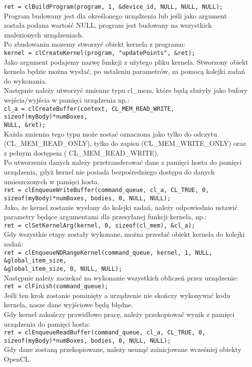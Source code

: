 \centering\verb+ret = clBuildProgram(program, 1, &device_id, NULL, NULL, NULL);+\\\flushleft
Program budowany jest dla określonego urządzenia lub jeśli jako argument została podana wartość NULL, program jest budowany na wszystkich znalezionych urządzeniach. \\
Po zbudowaniu mozemy stworzyć obiekt kernela z programu:\\
\centering\verb+kernel = clCreateKernel(program, "updatePoints", &ret);+\\\flushleft
Jako argument podajemy nazwę funkcji z użytego pliku kernela. Stworzony obiekt kernela będzie można wysłać, po ustaleniu parametrów, za pomocą kolejki zadań do wykonania. \\
Następnie należy utworzyć zmienne typu cl\_mem, które będą służyły jako bufory wejścia/wyjścia w pamięci urządzenia np.:\\
\centering\verb+cl_a = clCreateBuffer(context, CL_MEM_READ_WRITE, sizeof(myBody)*numBoxes,+\\
\verb+NULL, &ret);+\\\flushleft
Każda zmienna tego typu może zostać oznaczona jako tylko do odczytu (CL\_MEM\_READ\_ONLY), tylko do zapisu (CL\_MEM\_WRITE\_ONLY) oraz z pełnym dostępem ( CL\_MEM\_READ\_WRITE). \\
Po utworzeniu danych należy przetransferować dane z pamięci hosta do pamięci urządzenia, gdyż kernel nie posiada bezpośredniego dostępu do danych umieszczonych w pamięci hosta. \\
\centering\verb+ret = clEnqueueWriteBuffer(command_queue, cl_a, CL_TRUE, 0,+\\
\verb+sizeof(myBody)*numBoxes, bodies, 0, NULL, NULL);+\\\flushleft
Jako, że kernel zostanie wysłany do kolejki zadań, należy odpowiednio ustawić parametry będące argumentami dla przesyłanej funkcji kernela, np.: \\
\centering\verb+ret = clSetKernelArg(kernel, 0, sizeof(cl_mem), &cl_a);+\\\flushleft
Gdy wszystkie etapy zostały wykonane, można przesłać obiekt kernela do kolejki zadań: \\
\centering\verb+ret = clEnqueueNDRangeKernel(command_queue, kernel, 1, NULL, &global_item_size,+\\
\verb+&global_item_size, 0, NULL, NULL);+\\\flushleft
Następnie należy zaczekać na wykonanie wszystkich obliczeń przez urządzenie:\\
\centering\verb+ret = clFinish(command_queue);+\\\flushleft
Jeśli ten krok zostanie pominięty a urządzenie nie skończy wykonywać kodu kernela, nasze dane wyjściowe będą błędne. \\
Gdy kernel zakończy prawidłowo pracę, należy przekopiować wynik z pamięci urządzenia do pamięci hosta: \\
\centering\verb+ret = clEnqueueReadBuffer(command_queue, cl_a, CL_TRUE, 0,+\\
\verb+sizeof(myBody)*numBoxes, bodies, 0, NULL, NULL);+\\\flushleft
Gdy dane zostaną przekopiowane, należy usunąć zainicjowane wcześniej obiekty OpenCL. \\
